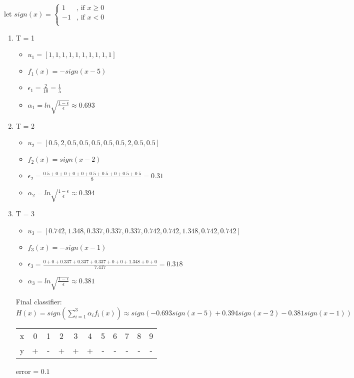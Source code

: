 \documentclass[12pt, a4paper]{article}
\begin{document}
\begin{enumerate}
let $sign(x) = 
\begin{cases}
    1&\text{, if } x \geq 0\\
    -1&\text{, if } x < 0\\
\end{cases}
$\par
\begin{enumerate}
    \item T = 1
    \begin{itemize}
        \item $u_1 = [1, 1, 1, 1, 1, 1, 1, 1, 1, 1]$
        \item $f_1(x) = -sign(x-5)$
        \item $\epsilon_1 = \frac{2}{10} = \frac{1}{5}$
        \item $\alpha_1 = ln\sqrt{\frac{1-\epsilon}{\epsilon}} \approx 0.693$
    \end{itemize}
    \item T = 2
    \begin{itemize}
        \item $u_2 = [0.5, 2, 0.5, 0.5, 0.5, 0.5, 0.5, 2, 0.5, 0.5]$
        \item $f_2(x) = sign(x-2)$
        \item $\epsilon_2 = \frac{0.5+0+0+0+0+0.5+0.5+0+0.5+0.5}{8} = 0.31$
        \item $\alpha_2 = ln\sqrt{\frac{1-\epsilon}{\epsilon}} \approx 0.394$
    \end{itemize}
    \item T = 3
    \begin{itemize}
        \item $u_3 = [0.742, 1.348, 0.337, 0.337, 0.337, 0.742, 0.742, 1.348, 0.742, 0.742]$
        \item $f_3(x) = -sign(x-1)$
        \item $\epsilon_3 = \frac{0+0+0.337+0.337+0.337+0+0+1.348+0+0}{7.417} = 0.318$
        \item $\alpha_3 = ln\sqrt{\frac{1-\epsilon}{\epsilon}} \approx 0.381$
    \end{itemize}
    Final classifier: $H(x) = sign(\sum\limits_{i=1}^3 \alpha_i f_i(x)) \approx sign(-0.693sign(x-5) + 0.394 sign(x-2) - 0.381 sign(x-1))$
    \begin{table}[H]
        \centering
        \begin{tabular}{c|cccccccccc}\hline
            x&0&1&2&3&4&5&6&7&8&9\\
            y&+&-&+&+&+&-&-&-&-&-\\ \hline
        \end{tabular}
    \end{table}\par
    error = $0.1$
\end{enumerate}


\end{enumerate}
\end{document}
